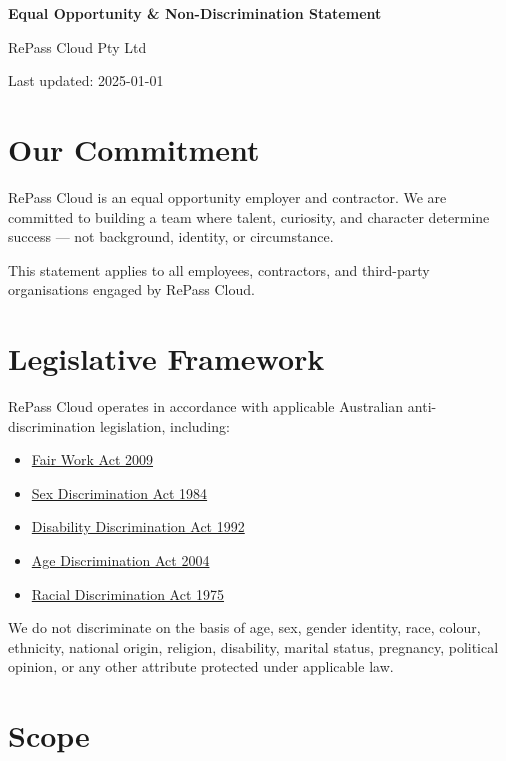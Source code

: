 \documentclass[11pt]{article}
\begin{document}
{\LARGE \textbf{Equal Opportunity \& Non-Discrimination Statement}}

\vspace{4pt}
RePass Cloud Pty Ltd

\vspace{2pt}
Last updated: 2025-01-01

\vspace{12pt}

\section{Our Commitment}

RePass Cloud is an equal opportunity employer and contractor. We are committed to building a team where talent, curiosity, and character determine success --- not background, identity, or circumstance.

This statement applies to all employees, contractors, and third-party organisations engaged by RePass Cloud.

\section{Legislative Framework}

RePass Cloud operates in accordance with applicable Australian anti-discrimination legislation, including:

\begin{itemize}
\item \href{https://www.legislation.gov.au/C2009A00028}{Fair Work Act 2009}
\item \href{https://www.legislation.gov.au/C2004A02868}{Sex Discrimination Act 1984}
\item \href{https://www.legislation.gov.au/C2004A04426}{Disability Discrimination Act 1992}
\item \href{https://www.legislation.gov.au/C2004A01302}{Age Discrimination Act 2004}
\item \href{https://www.legislation.gov.au/C2004A00274}{Racial Discrimination Act 1975}
\end{itemize}

We do not discriminate on the basis of age, sex, gender identity, race, colour, ethnicity, national origin, religion, disability, marital status, pregnancy, political opinion, or any other attribute protected under applicable law.

\section{Scope}
\end{document}
